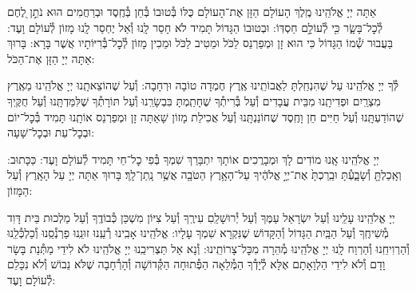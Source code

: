 \documentclass[twoside, openany, parskip=half, 11pt]{book}
\begin{document}
\nextpage
{}
אַתָּה יְיָ אֱלֹהֵֽינוּ מֶֽלֶךְ הָעוֹלָם הַזָּן אֶת־הָעוֹלָם כֻּלּוֹ בְּ֯טוּבוֹ בְּ֯חֵן בְּ֯חֶֽסֶד וּבְרַחֲמִים הוּא נֹתֵ֣ן לֶ֭חֶם לְ֯כׇל־בָּשָׂ֑ר כִּ֖י לְ֯עוֹלָ֣ם חַסְדּֽוֹ: וּבְטוּבוֹ הַגָּדוֹל תָּמִיד לֹא חָסַר לָֽנוּ וְ֯אַל יֶחְסַר לָֽנוּ מָזוֹן לְ֯עוֹלָם וָעֶד: בַּעֲבוּר שְׁ֯מוֹ הַגָּדוֹל כִּי הוּא זָן וּמְפַרְנֵס לַכֹּל וּמֵטִיב לַכֹּל וּמֵכִין מָזוֹן לְ֯כׇל־בְּ֯רִיּוֹתָיו אֲשֶׁר בָּרָא: בָּרוּךְ אַתָּה יְיָ הַזָּן אֶת־הַכֹּל:



לְּ֯ךָ יְיָ אֱלֹהֵֽינוּ עַל שֶׁהִנְחַֽלְתָּ לַאֲבוֹתֵֽינוּ אֶֽרֶץ חֶמְדָה טוֹבָה וּרְחָבָה: וְ֯עַל שֶׁהוֹצֵאתָֽנוּ יְיָ אֱלֹהֵֽינוּ מֵאֶֽרֶץ מִצְרַֽיִם וּפְדִיתָֽנוּ מִבֵּית עֲבָדִים וְ֯עַל בְּ֯רִיתְ֯ךָ שֶׁחָתַֽמְתָּ בִּבְשָׂרֵֽנוּ וְ֯עַל תּוֹרָתְ֯ךָ שֶׁלִּמַּדְתָּֽנוּ וְ֯עַל חֻקֶּֽיךָ שֶׁהוֹדַעְתָּֽנוּ וְ֯עַל חַיִּים חֵן וָחֶֽסֶד שֶׁחוֹנַנְתָּֽנוּ וְ֯עַל אֲכִילַת מָזוֹן שָׁאַתָּה זָן וּמְפַרְנֵס אוֹתָֽנוּ תָּמִיד בְּ֯כׇל־יוֹם וּבְכׇל־עֵת וּבְכׇל־שָׁעָה:


\alhanisim

יְיָ אֱלֹהֵֽינוּ אָֽנוּ מוֹדִים לָךְ וּמְבָרֲכִים אוֹתָךְ יִתְבָּרַךְ שִׁמְךָ בְּ֯פִי כׇל־חַי תָּמִיד לְ֯עוֹלָם וָעֶד: כַּכָּתוּב: וְאָֽכַלְתָּ֖ וְ֯שָׂבָ֑עְ֯תָּ וּבֵֽרַכְתָּ֙ אֶת־יְיָ֣ אֱלֹהֶ֔יךָ עַל־הָאָ֥רֶץ הַטֹּבָ֖ה אֲשֶׁ֥ר נָֽתַן־לָֽךְ׃ בָּרוּךְ אַתָּה יְיָ עַל הָאָֽרֶץ וְ֯עַל הַמָּזוֹן:



יְיָ אֱלֹהֵֽינוּ עָלֵֽינוּ וְ֯עַל יִשְׂרָאֵל עַמֶּךָ וְ֯עַל יְ֯רוּשָׁלַֽםִ עִירֶֽךָ וְ֯עַל צִיּוֹן מִשְׁכַּן כְּ֯בוֹדֶֽךָ וְ֯עַל מַלְכוּת בֵּית דָּוִד מְ֯שִׁיחֶֽךָ וְ֯עַל הַבַּֽיִת הַגָּדוֹל וְ֯הַקָּדוֹשׁ שֶׁנִּקְרָא שִׁמְךָ עָלָיו: אֱלֹהֵֽינוּ אָבִֽינוּ רְ֯עֵֽנוּ זוּנֵֽנוּ פַרְנְ֯סֵֽנוּ וְ֯כַלְכְּ֯לֵֽנוּ וְ֯הַרְוִיחֵֽנוּ וְ֯הַרְוַח לָֽנוּ יְיָ אֱלֹהֵֽינוּ מְ֯הֵרָה מִכׇּל־צָרוֹתֵֽינוּ: וְ֯נָא אַל תַּצְרִיכֵֽנוּ יְיָ אֱלֹהֵֽינוּ לֹא לִידֵי מַתְּ֯נַת בָּשָׂר וָדָם וְ֯לֹא לִידֵי הַלְוָאָתָם אֶלָּא לְ֯יָדְ֯ךָ הַמְּ֯לֵאָה הַפְּ֯תוּחָה הַקְּ֯דוֹשָׁה וְ֯הָרְ֯חָבָה שֶׁלֹּא נֵבוֹשׁ וְ֯לֹא נִכָּלֵם לְ֯עוֹלָם וָעֶד:

\enlargethispage{\baselineskip}
\end{document}
